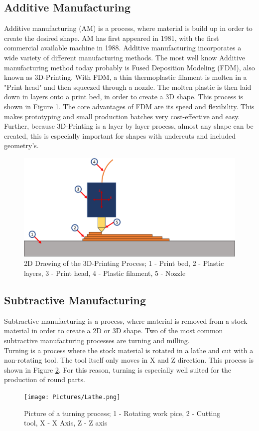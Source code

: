 \subsection{Additive Manufacturing}
Additive manufacturing (AM) is a process, where material is build up in order to create the desired shape. AM has first appeared in 1981, with the first commercial available machine in 1988.
Additive manufacturing incorporates a wide variety of different manufacturing methods. The most well know Additive manufacturing method today probably is Fused Deposition Modeling (FDM), also known as 3D-Printing.
With FDM, a thin thermoplastic filament is molten in a "Print head" and then squeezed through a nozzle. The molten plastic is then laid down in layers onto a print bed, in order to create a 3D shape. This process is shown in Figure \ref{TheoPrinter}.
The core advantages of FDM are its speed and flexibility. This makes prototyping and small production batches very cost-effective and easy.
Further, because 3D-Printing is a layer by layer process, almost any shape can be created, this is especially important for shapes with undercuts and included geometry's.\cite{FraunhoferInstitutAM}
 
\begin{figure}
    \begin{center}
    \includegraphics[width=12cm]{Pictures/TheoPrinter.png}
    \caption[2D Drawing of the 3D-Printing Process]{2D Drawing of the 3D-Printing Process; 1 - Print bed, 2 - Plastic layers, 3 - Print head, 4 - Plastic filament, 5 - Nozzle}
    \label{TheoPrinter}
    \end{center}
\end{figure}
 
\subsection{Subtractive Manufacturing}
Subtractive manufacturing is a process, where material is removed from a stock material in order to create a 2D or 3D shape. Two of the most common subtractive manufacturing processes are turning and milling.\\
Turning is a process where the stock material is rotated in a lathe and cut with a non-rotating tool. The tool itself only moves in X and Z direction. This process is shown in Figure \ref{TheoLathe}. For this reason, turning is especially well suited for the production of round parts.
 
\begin{figure}
    \begin{center}
    \texttt{[image: Pictures/Lathe.png]}
    \caption[Picture of a turning process]{Picture of a turning process; 1 - Rotating work pice, 2 - Cutting tool, X - X Axis, Z - Z axis}
    \label{TheoLathe}
    \end{center}
\end{figure}
 
 
 
 
 

